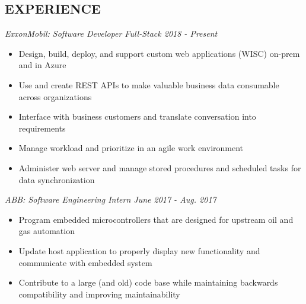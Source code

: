\documentclass[line,margin]{res}
\begin{document}
\address{23550 Northgate Crossing Blvd.}
\address{Spring Texas, 77373, APT. 153}

\begin{resume}

  \section{EXPERIENCE} {\sl ExxonMobil: Software Developer Full-Stack
          \hfill 2018 - \sl Present}
                 \begin{itemize}  \itemsep -2pt %
                 \item Design, build, deploy, and support custom web applications (WISC) on-prem
                   and in Azure 
                 \item Use and create REST APIs to make valuable business data consumable across
                   organizations
                 \item Interface with business customers and translate conversation into
                   requirements 
                \item Manage workload and prioritize in an agile work environment 
                \item Administer web server and manage stored procedures and scheduled
                  tasks for data synchronization
                \end{itemize}

                 {\sl ABB: Software Engineering Intern  \hfill June 2017 - Aug. 2017 }
                 \begin{itemize}  \itemsep -2pt %
                 \item Program embedded microcontrollers that are designed for upstream
                   oil and gas automation 
                 \item Update host application to properly display new functionality and
                   communicate with embedded system
                 \item Contribute to a large (and old) code base while maintaining
                   backwards compatibility and improving maintainability
                 \end{itemize} 


\end{resume}
\end{document}
